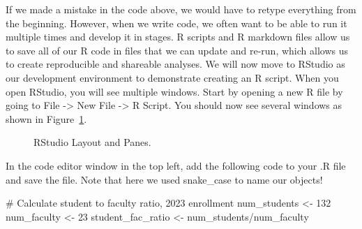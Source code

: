 \documentclass[
  letterpaper,
]{krantz}
\makeatletter
\newenvironment{Shaded}{\begin{snugshade}}{\end{snugshade}}
\newcommand{\CommentTok}[1]{\textcolor[rgb]{0.37,0.37,0.37}{#1}}
\newcommand{\DecValTok}[1]{\textcolor[rgb]{0.68,0.00,0.00}{#1}}
\newcommand{\NormalTok}[1]{\textcolor[rgb]{0.00,0.23,0.31}{#1}}
\newcommand{\OtherTok}[1]{\textcolor[rgb]{0.00,0.23,0.31}{#1}}
\newcommand{\SpecialCharTok}[1]{\textcolor[rgb]{0.37,0.37,0.37}{#1}}
\newenvironment{kframe}{%
\medskip{}
\setlength{\fboxsep}{.8em}
 \def\at@end@of@kframe{}%
 \ifinner\ifhmode%
  \def\at@end@of@kframe{\end{minipage}}%
  \begin{minipage}{\columnwidth}%
 \fi\fi%
 \def\FrameCommand##1{\hskip\@totalleftmargin \hskip-\fboxsep
 \colorbox{shadecolor}{##1}\hskip-\fboxsep
     \hskip-\linewidth \hskip-\@totalleftmargin \hskip\columnwidth}%
 \MakeFramed {\advance\hsize-\width
   \@totalleftmargin\z@ \linewidth\hsize
   \@setminipage}}%
 {\par\unskip\endMakeFramed%
 \at@end@of@kframe}
\renewenvironment{Shaded}{\begin{kframe}}{\end{kframe}}
\makeatother
\begin{document}
If we made a mistake in the code above, we would have to retype
everything from the beginning. However, when we write code, we often
want to be able to run it multiple times and develop it in stages. R
scripts and R markdown files allow us to save all of our R code in files
that we can update and re-run, which allows us to create reproducible
and shareable analyses. We will now move to RStudio as our development
environment to demonstrate creating an R script. When you open RStudio,
you will see multiple windows. Start by opening a new R file by going to
File -\textgreater{} New File -\textgreater{} R Script. You should now
see several windows as shown in Figure~\ref{fig-rstudio}.

\begin{figure}


\caption{\label{fig-rstudio}RStudio Layout and Panes.}

\end{figure}%

In the code editor window in the top left, add the following code to
your .R file and save the file. Note that here we used snake\_case to
name our objects!

\begin{Shaded}
\begin{Highlighting}[]
\CommentTok{\# Calculate student to faculty ratio, 2023 enrollment}
\NormalTok{num\_students }\OtherTok{\textless{}{-}} \DecValTok{132}
\NormalTok{num\_faculty }\OtherTok{\textless{}{-}} \DecValTok{23}
\NormalTok{student\_fac\_ratio }\OtherTok{\textless{}{-}}\NormalTok{ num\_students}\SpecialCharTok{/}\NormalTok{num\_faculty}
\end{Highlighting}
\end{Shaded}
\end{document}
